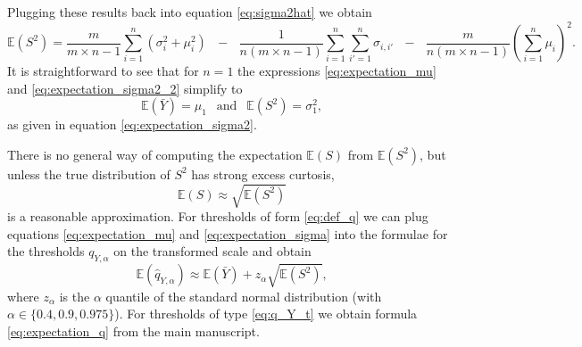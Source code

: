 \documentclass[12pt]{article}
\begin{document}
Plugging these results back into equation \eqref{eq:sigma2hat} we obtain
\begin{equation}
\mathbb{E}(S^2) = \frac{m}{m \times n - 1} \sum_{i = 1}^n (\sigma_{i}^2 + \mu_i^2) \ \ \ - \ \ \ \frac{1}{n(m \times n - 1)} \sum_{i = 1}^n \sum_{i' = 1}^n \sigma_{i,i'} \ \ \ - \ \ \ \frac{m}{n(m \times n - 1)}\left(\sum_{i = 1}^n \mu_i\right)^2.
\label{eq:expectation_sigma2_2}
\end{equation}
It is straightforward to see that for $n = 1$ the expressions \eqref{eq:expectation_mu} and \eqref{eq:expectation_sigma2_2} simplify to
$$
\mathbb{E}(\bar{Y}) = \mu_1 \ \ \text{ and } \ \ \mathbb{E}(S^2) = \sigma^2_1,
$$
as given in equation \eqref{eq:expectation_sigma2}.

There is no general way of computing the expectation $\mathbb{E}(S)$ from $\mathbb{E}(S^2)$, but unless the true distribution of  $S^2$ has strong excess curtosis,
\begin{equation}
\mathbb{E}(S) \approx \sqrt{\mathbb{E}(S^2)}
\label{eq:expectation_sigma}
\end{equation}
is a reasonable approximation. For thresholds of form \eqref{eq:def_q} we can plug equations \eqref{eq:expectation_mu} and \eqref{eq:expectation_sigma} into the formulae for the thresholds $q_{Y, \alpha}$ on the transformed scale and obtain
$$
\mathbb{E}(\hat{q}_{Y, \alpha}) \approx \mathbb{E}(\bar{Y}) + z_\alpha \sqrt{\mathbb{E}(S^2)},
$$
where $z_\alpha$ is the $\alpha$ quantile of the standard normal distribution (with $\alpha \in \{0.4, 0.9, 0.975\}$). For thresholds of type \eqref{eq:q_Y_t} we obtain formula \eqref{eq:expectation_q} from the main manuscript.
\end{document}
